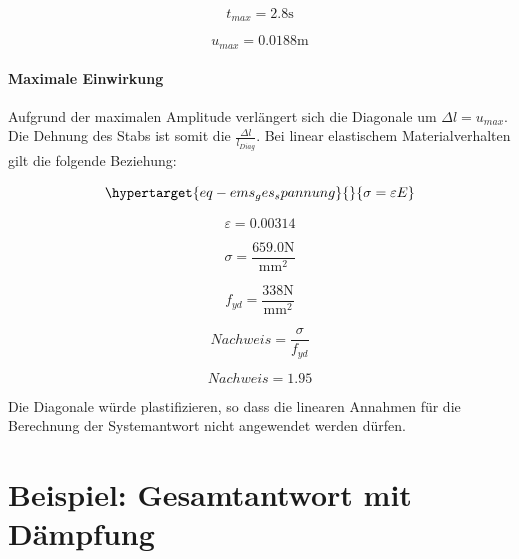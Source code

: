 \documentclass[
  letterpaper,
  DIV=11]{scrreprt}
\begin{document}
\begin{equation}t_{max} = 2.8 \text{s}\end{equation}

\begin{equation}u_{max} = 0.0188 \text{m}\end{equation}

\hypertarget{maximale-einwirkung}{%
\subsubsection{Maximale Einwirkung}\label{maximale-einwirkung}}

Aufgrund der maximalen Amplitude verlängert sich die Diagonale um
\(\Delta l = u_{max}\). Die Dehnung des Stabs ist somit die
\(\frac{\Delta l}{l_{Diag}}\). Bei linear elastischem Materialverhalten
gilt die folgende Beziehung:

\begin{equation}\protect\hypertarget{eq-ems_ges_spannung}{}{
\sigma = \varepsilon E
}\label{eq-ems_ges_spannung}\end{equation}

\begin{equation}\varepsilon = 0.00314\end{equation}

\begin{equation}\sigma = \frac{659.0 \text{N}}{\text{mm}^{2}}\end{equation}

\begin{equation}f_{yd} = \frac{338 \text{N}}{\text{mm}^{2}}\end{equation}

\begin{equation}Nachweis = \frac{\sigma}{f_{yd}}\end{equation}

\begin{equation}Nachweis = 1.95\end{equation}

Die Diagonale würde plastifizieren, so dass die linearen Annahmen für
die Berechnung der Systemantwort nicht angewendet werden dürfen.

\hypertarget{beispiel-gesamtantwort-mit-duxe4mpfung}{%
\chapter{Beispiel: Gesamtantwort mit
Dämpfung}\label{beispiel-gesamtantwort-mit-duxe4mpfung}}
\end{document}
